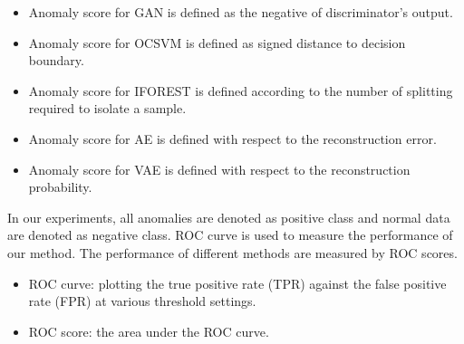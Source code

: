 \documentclass[a4paper,conference]{IEEEtran}
\begin{document}
\begin{itemize}
\item Anomaly score for GAN is defined as the negative of discriminator's output.
\item Anomaly score for OCSVM is defined as   signed distance to  decision boundary.
\item Anomaly score for IFOREST is defined according to the number of splitting required to isolate a sample.
\item Anomaly score for AE is defined with respect to the reconstruction error.
\item Anomaly score for VAE is defined with respect to the reconstruction probability.
\end{itemize}

In our experiments, all anomalies are denoted as positive class and  normal data are denoted as negative class.  ROC curve is used to measure the performance of our method. The performance of different methods are measured by ROC scores.
\begin{itemize}
\item ROC  curve: plotting the true positive rate (TPR) against the false positive rate (FPR) at various threshold settings.
\item ROC score: the area under the ROC curve.
\end{itemize}
\end{document}
